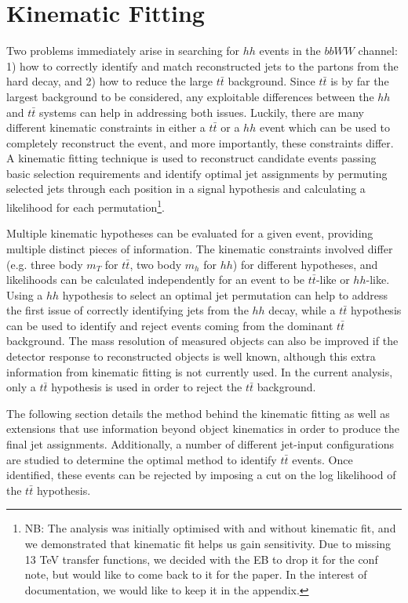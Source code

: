 
\section{Kinematic Fitting}
\label{subsec:KinFit}
Two problems immediately arise in searching for $hh$ events in the $bbWW$ channel: 1) how to correctly identify and match reconstructed jets to the partons from the hard decay, and 2) how to reduce the large $t\bar{t}$ background. Since $t\bar{t}$ is by far the largest background to be considered, any exploitable differences between the $hh$ and $t\bar{t}$ systems can help in addressing both issues. Luckily, there are many different kinematic constraints in either a $t\bar{t}$ or a $hh$ event which can be used to completely reconstruct the event, and more importantly, these constraints differ. A kinematic fitting technique is used to reconstruct candidate events passing basic selection requirements and identify optimal jet assignments by permuting selected jets through each position in a signal hypothesis and calculating a likelihood for each permutation\footnote{ NB:  The analysis was initially optimised with and without kinematic fit, and we demonstrated that kinematic fit helps us gain sensitivity. Due to missing 13 TeV transfer functions, we decided with the EB to drop it for the conf note, but would like to come back to it for the paper. In the interest of documentation, we would like to keep it in the appendix.}.

Multiple kinematic hypotheses can be evaluated for a given event, providing multiple distinct pieces of information. The kinematic constraints involved differ (e.g. three body $m_{T}$ for $t\bar{t}$, two body $m_{h}$ for $hh$) for different hypotheses, and likelihoods can be calculated independently for an event to be $t\bar{t}$-like or $hh$-like. Using a $hh$ hypothesis to select an optimal jet permutation can help to address the first issue of correctly identifying jets from the $hh$ decay, while a $t\bar{t}$ hypothesis can be used to identify and reject events coming from the dominant $t\bar{t}$ background. The mass resolution of measured objects can also be improved if the detector response to reconstructed objects is well known, although this extra information from kinematic fitting is not currently used. In the current analysis, only a $t\bar{t}$ hypothesis is used in order to reject the $t\bar{t}$ background.

The following section details the method behind the kinematic fitting as well as extensions that use information beyond object kinematics in order to produce the final jet assignments. Additionally, a number of different jet-input configurations are studied to determine the optimal method to identify $t\bar{t}$ events. Once identified, these events can be rejected by imposing a cut on the log likelihood of the $t\bar{t}$ hypothesis.

